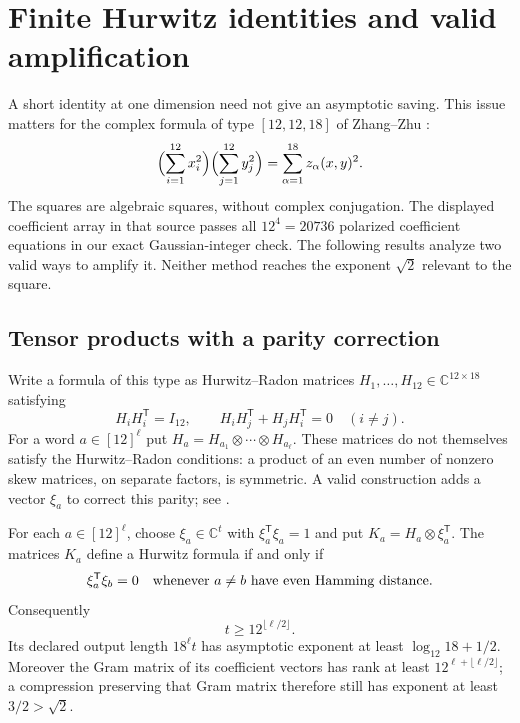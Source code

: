 \section{Finite Hurwitz identities and valid amplification}
\label{sec:hurwitz-amplification}

A short identity at one dimension need not give an asymptotic saving.
This issue matters for the complex formula of type $[12,12,18]$ of
Zhang--Zhu \cite[Theorem~1.1, equations~(3.1)--(3.3)]{ZhangZhu2026}:
\[
 \Bigl(\sum_{i=1}^{12}x_i^2\Bigr)
 \Bigl(\sum_{j=1}^{12}y_j^2\Bigr)
   =\sum_{\alpha=1}^{18}z_\alpha(x,y)^2.
\]
The squares are algebraic squares, without complex conjugation.
The displayed coefficient array in that source passes all $12^4=20736$
polarized coefficient equations in our exact Gaussian-integer check.
The following results analyze two valid ways to amplify it. Neither
method reaches the exponent $\sqrt2$ relevant to the square.

\subsection{Tensor products with a parity correction}

Write a formula of this type as Hurwitz--Radon matrices
$H_1,\ldots,H_{12}\in\mathbb C^{12\times18}$ satisfying
\[
 H_iH_i^{\mathsf T}=I_{12},\qquad
 H_iH_j^{\mathsf T}+H_jH_i^{\mathsf T}=0\quad(i\ne j).
\]
For a word $a\in[12]^\ell$ put
$H_a=H_{a_1}\otimes\cdots\otimes H_{a_\ell}$.
These matrices do not themselves satisfy the Hurwitz--Radon conditions:
a product of an even number of nonzero skew matrices, on separate
factors, is symmetric. A valid construction adds a vector $\xi_a$ to
correct this parity; see \cite[Section~5.2, p.~12]{Hrubes2026}.

\begin{proposition}
\label{prop:hurwitz-parity-cost}
For each $a\in[12]^\ell$, choose $\xi_a\in\mathbb C^t$ with
$\xi_a^{\mathsf T}\xi_a=1$ and put
$K_a=H_a\otimes\xi_a^{\mathsf T}$.
The matrices $K_a$ define a Hurwitz formula if and only if
\[
 \xi_a^{\mathsf T}\xi_b=0
 \quad\hbox{whenever }a\ne b\hbox{ have even Hamming distance}.
\]
Consequently
\[
 t\ge12^{\lfloor\ell/2\rfloor}.
\]
Its declared output length $18^\ell t$ has asymptotic exponent at
least $\log_{12}18+1/2$. Moreover the Gram matrix of its coefficient
vectors has rank at least
$12^{\ell+\lfloor\ell/2\rfloor}$; a compression preserving that Gram
matrix therefore still has exponent at least $3/2>\sqrt2$.
\end{proposition}

